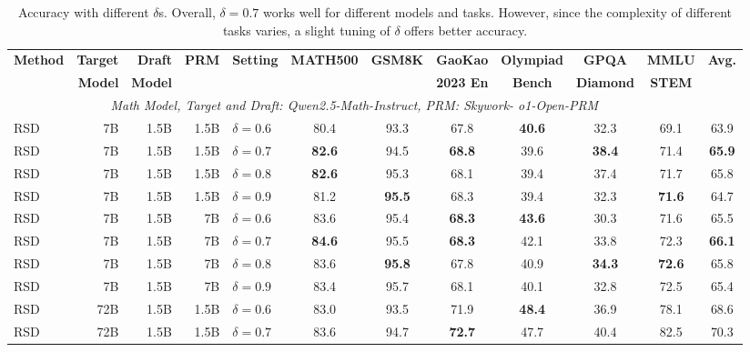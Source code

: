 \documentclass{article}
\theoremstyle{plain}
\theoremstyle{definition}
\theoremstyle{remark}
\begin{document}
\begin{table}[h!]
\caption{Accuracy with different $\delta$s. Overall, $\delta=0.7$ works well for different models and tasks. However, since the complexity of different tasks varies, a slight tuning of $\delta$ offers better accuracy. }
\label{tab:different deltas}
\vskip 0.1in
\scriptsize
\begin{center}
\begin{tabular}{lrrrlccccccc}
\toprule
\multirow{2}{*}{\textbf{Method}} & \textbf{Target} & \textbf{Draft} & \multirow{2}{*}{\textbf{PRM}} & \multirow{2}{*}{\textbf{Setting}} & \multirow{2}{*}{\textbf{MATH500}} & \multirow{2}{*}{\textbf{GSM8K}} & \textbf{GaoKao} &  \textbf{Olympiad} &  \textbf{GPQA} &  \textbf{MMLU} & \multirow{2}{*}{\textbf{Avg.}} \\
& \textbf{Model} & \textbf{Model} & & & & & \textbf{2023 En} &  \textbf{Bench} &  \textbf{Diamond} &  \textbf{STEM} \\
\midrule
\multicolumn{11}{c}{\textit{Math Model, Target and Draft: Qwen2.5-Math-Instruct, PRM: Skywork-
o1-Open-PRM}} \\
\midrule
RSD & 7B & 1.5B & 1.5B & $\delta=0.6$ & 80.4 & 93.3 & 67.8 & \textbf{40.6} & 32.3 & 69.1 & 63.9 \\
RSD & 7B & 1.5B & 1.5B & $\delta=0.7$ & \textbf{82.6} & 94.5 & \textbf{68.8} & 39.6 & \textbf{38.4} & 71.4 & \textbf{65.9} \\
RSD & 7B & 1.5B & 1.5B & $\delta=0.8$ & \textbf{82.6} & 95.3 & 68.1 & 39.4 & 37.4 & 71.7 & 65.8 \\
RSD & 7B & 1.5B & 1.5B & $\delta=0.9$ & 81.2 & \textbf{95.5} & 68.3 & 39.4 & 32.3 & \textbf{71.6} & 64.7 \\
\cmidrule(lr){1-12}
RSD & 7B & 1.5B & 7B & $\delta=0.6$ & 83.6 & 95.4 & \textbf{68.3} & \textbf{43.6} & 30.3 & 71.6 & 65.5 \\
RSD & 7B & 1.5B & 7B & $\delta=0.7$ & \textbf{84.6} & 95.5 & \textbf{68.3} & 42.1 & 33.8 & 72.3 & \textbf{66.1} \\
RSD & 7B & 1.5B & 7B & $\delta=0.8$ & 83.6 & \textbf{95.8} & 67.8 & 40.9 & \textbf{34.3} & \textbf{72.6} & 65.8 \\
RSD & 7B & 1.5B & 7B & $\delta=0.9$ & 83.4 & 95.7 & 68.1 & 40.1 & 32.8 & 72.5 & 65.4 \\
\cmidrule(lr){1-12}
RSD & 72B & 1.5B & 1.5B & $\delta=0.6$ & 83.0 & 93.5 & 71.9 & \textbf{48.4} & 36.9 & 78.1 & 68.6 \\
RSD & 72B & 1.5B & 1.5B & $\delta=0.7$ & 83.6 & 94.7 & \textbf{72.7} & 47.7 & 40.4 & 82.5 & 70.3 \\

\end{tabular}
\end{center}
\end{table}
\end{document}
